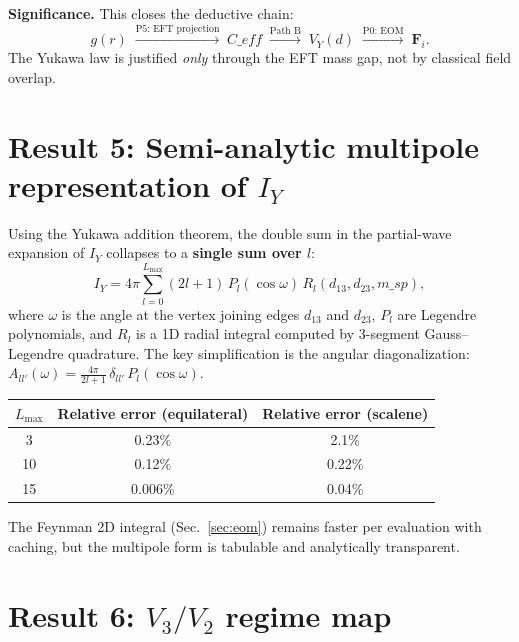 \documentclass[11pt,a4paper]{article}
\def\msp{m\_sp}%
\def\Ceff{C\_eff}%
\newcommand{\vF}{\mathbf{F}}
\newcommand{\msp}{m_{\rm sp}}
\newcommand{\Ceff}{C_{\rm eff}}
\begin{document}
\medskip
\noindent\textbf{Significance.}  This closes the deductive chain:
\[
  g(r) \;\xrightarrow{\text{P5: EFT projection}}\; \Ceff
  \;\xrightarrow{\text{Path B}}\; V_Y(d)
  \;\xrightarrow{\text{P0: EOM}}\; \vF_i.
\]
The Yukawa law is justified \emph{only} through the EFT mass gap, not
by classical field overlap.

\section{Result 5: Semi-analytic multipole representation of $I_Y$}
\label{sec:multipole}

Using the Yukawa addition theorem, the double sum in the partial-wave
expansion of $I_Y$ collapses to a \textbf{single sum over $l$}:
\begin{equation}
  \boxed{
  I_Y = 4\pi \sum_{l=0}^{L_{\max}} (2l+1)\,P_l(\cos\omega)\,
    R_l(d_{13}, d_{23}, \msp),
  }
  \label{eq:IY-multipole}
\end{equation}
where $\omega$ is the angle at the vertex joining edges $d_{13}$ and $d_{23}$,
$P_l$ are Legendre polynomials, and $R_l$ is a 1D radial integral
computed by 3-segment Gauss--Legendre quadrature.  The key
simplification is the angular diagonalization:
$A_{ll'}(\omega) = \frac{4\pi}{2l+1}\,\delta_{ll'}\,P_l(\cos\omega)$.

\begin{center}
\begin{tabular}{ccc}
  \toprule
  $L_{\max}$ & Relative error (equilateral) & Relative error (scalene) \\
  \midrule
  3  & 0.23\% & 2.1\% \\
  10 & 0.12\% & 0.22\% \\
  15 & 0.006\% & 0.04\% \\
  \bottomrule
\end{tabular}
\end{center}

The Feynman 2D integral (Sec.~\ref{sec:eom}) remains faster per evaluation
with caching, but the multipole form is tabulable and analytically
transparent.

\section{Result 6: $V_3/V_2$ regime map}
\label{sec:v3v2}
\end{document}
